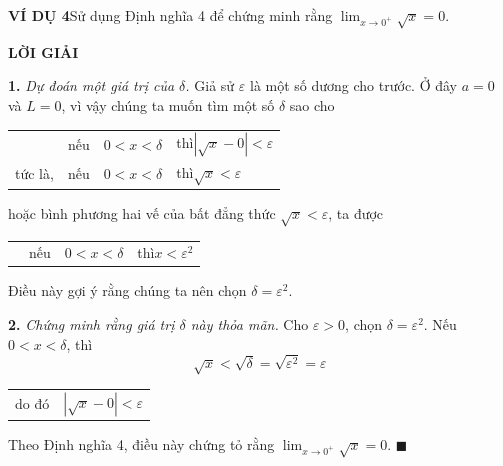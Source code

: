 \begin{minipage}[t][\textheight][t]{120mm}
    \noindent\textbf{\textsf{\color{stewartcyan}VÍ DỤ 4}}\quad Sử dụng Định nghĩa 4 để chứng minh rằng $\displaystyle\lim_{x \to 0^+} \sqrt{x} = 0$.

    \vspace{0.1em}
    \noindent\textbf{\textsf{\color{stewartcyan}LỜI GIẢI}}

    \noindent\textbf{1.} \textit{Dự đoán một giá trị của $\delta$.} Giả sử $\varepsilon$ là một số dương cho trước. Ở đây $a = 0$ và $L = 0$, vì vậy chúng ta muốn tìm một số $\delta$ sao cho
    \begin{center}
    \renewcommand{\arraystretch}{1.2}
    \begin{tabular}{r@{\quad}l@{\qquad}l@{\qquad}l}
    & nếu & $0 < x < \delta$ & thì\qquad $|\sqrt{x} - 0| < \varepsilon$ \\
    tức là, & nếu & $0 < x < \delta$ & thì\qquad $\sqrt{x} < \varepsilon$
    \end{tabular}
    \end{center}
    \vspace{-0.2em}
    hoặc bình phương hai vế của bất đẳng thức $\sqrt{x} < \varepsilon$, ta được
    \begin{center}
    \renewcommand{\arraystretch}{1.2}
    \begin{tabular}{r@{\quad}l@{\qquad}l@{\qquad}l}
    \phantom{tức là,} & nếu & $0 < x < \delta$ & thì\qquad $x < \varepsilon^2$
    \end{tabular}
    \end{center}
    Điều này gợi ý rằng chúng ta nên chọn $\delta = \varepsilon^2$.

    \vspace{0.2em}
    \noindent\textbf{2.} \textit{Chứng minh rằng giá trị $\delta$ này thỏa mãn.} Cho $\varepsilon > 0$, chọn $\delta = \varepsilon^2$. Nếu $0 < x < \delta$, thì
    \[
    \sqrt{x} < \sqrt{\delta} = \sqrt{\varepsilon^2} = \varepsilon
    \]
    \begin{center}
    \vspace{-0.3em}
    \begin{tabular}{r@{\qquad\qquad}l}
    do đó & $|\sqrt{x} - 0| < \varepsilon$
    \end{tabular}
    \end{center}
    \vspace{-0.2em}
    Theo Định nghĩa 4, điều này chứng tỏ rằng $\displaystyle\lim_{x \to 0^+} \sqrt{x} = 0$. \hfill {\color{stewartcyan}$\blacksquare$}


\end{minipage}
